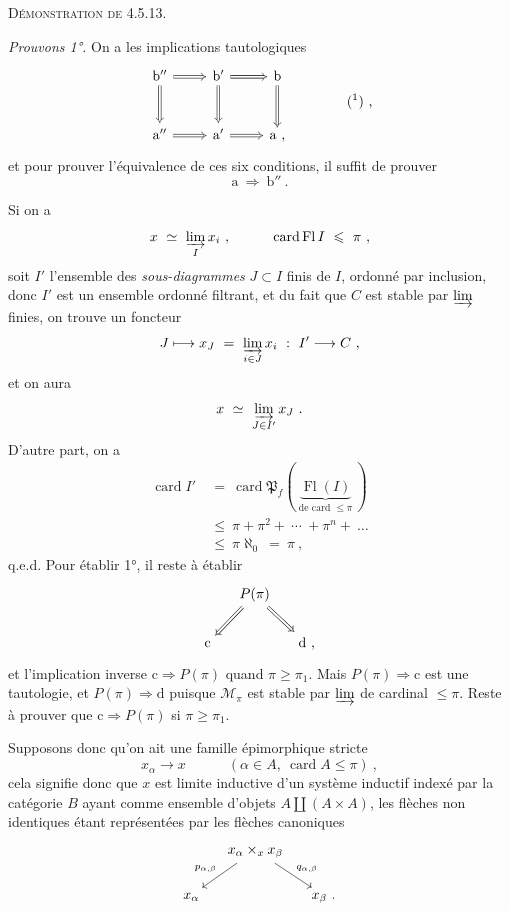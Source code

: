 \documentclass[11pt]{article}
\newcommand{\printedpage}[1]{\marginpar{\footnotesize p.~#1}}
\newcommand{\msp}[1]{\marginpar{\footnotesize [#1]}}
\newcommand{\card}{\operatorname{card}}
\newcommand{\Fl}{\operatorname{Fl}}
\begin{document}
\textsc{Démonstration de 4.5.13.}

\textit{Prouvons 1°.} On a les implications tautologiques
\[
\begin{tikzcd}[row sep=large]
\mathrm{b}'' \arrow[r, Rightarrow] \arrow[d, Rightarrow] & \mathrm{b}' \arrow[r, Rightarrow] \arrow[d, Rightarrow] & \mathrm{b} \arrow[d, Rightarrow] \\
\mathrm{a}'' \arrow[r, Rightarrow] & \mathrm{a}' \arrow[r, Rightarrow] & \mathrm{a} \text{ ,}
\end{tikzcd}
\qquad\qquad \text{(\footnotemark) ,}
\]
et pour prouver l'équivalence de ces six conditions, il suffit de prouver
\[ \mathrm{a} \ \Longrightarrow \ \mathrm{b}'' \ . \]

\printedpage{40}

\msp{page 129}
Si on a
\[ x \ \simeq \ \varinjlim_{I} x_i \ , \qquad\quad \card \Fl I \ \leqslant \ \pi \ , \]
soit $I'$ l'ensemble des \textit{sous-diagrammes} $J \subset I$ finis de $I$, ordonné par inclusion, donc $I'$ est un ensemble ordonné filtrant, et du fait que $C$ est stable par $\varinjlim$ finies, on trouve un foncteur
\[ J \longmapsto x_J \ = \ \varinjlim_{i\in J} x_i \ : \ I' \longrightarrow C \ , \]
et on aura
\[ x \ \simeq \ \varinjlim_{J\in I'} x_J \ . \]
D'autre part, on a
\[
\begin{aligned}
\card I' \ &= \ \card \mathfrak{P}_f( \ \underbrace{\Fl(I)}_{\text{de card $\leqslant \pi$}} \ ) \\
&\leqslant \ \pi + \pi^2 + \ \cdots \ + \pi^n + \ \dots \\
&\leqslant \ \pi\aleph_0 \ = \ \pi \ ,
\end{aligned}
\]
q.e.d. Pour établir 1°, il reste à établir
\[
\begin{tikzcd}[column sep=small]
& P(\pi) \arrow[dl, Rightarrow] \arrow[dr, Rightarrow] & \\
\mathrm{c} & & \mathrm{d} \text{ ,}
\end{tikzcd}
\]
et l'implication inverse $\mathrm{c} \Longrightarrow P(\pi)$ quand $\pi \geqslant \pi_1$. Mais $P(\pi) \Longrightarrow \mathrm{c}$ est une tautologie, et $P(\pi) \Longrightarrow \mathrm{d}$ puisque $\mathcal{M}_{\pi}$ est stable par $\varinjlim$ de cardinal $\leqslant \pi$. Reste à prouver que $\mathrm{c} \Longrightarrow P(\pi)$ si $\pi \geqslant \pi_1$.

\msp{page 130}
Supposons donc qu'on ait une famille épimorphique stricte
\[ x_{\alpha} \longrightarrow x \qquad\quad (\alpha \in A,\ \card A \leqslant \pi) \ , \]
cela signifie donc que $x$ est limite inductive d'un système inductif indexé par la catégorie $B$ ayant comme ensemble d'objets $A \amalg (A\times A)$, les flèches non identiques étant représentées par les flèches canoniques
\[
\begin{tikzcd}[column sep=small]
& x_{\alpha} \times_x x_{\beta} \arrow[dl, "p_{\alpha,\beta}"'] \arrow[dr, "q_{\alpha,\beta}"] & \\
x_{\alpha} & & x_{\beta} \text{ .}
\end{tikzcd}
\]
\end{document}
